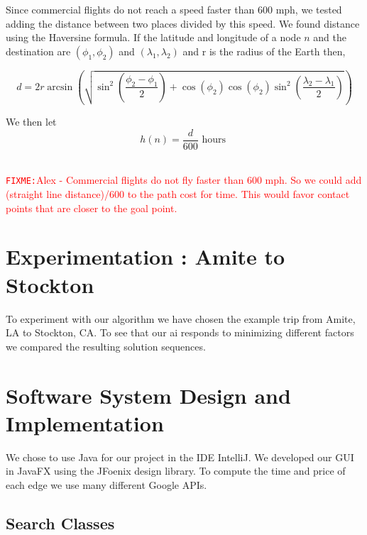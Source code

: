 \documentclass[11pt]{article}
\newcommand{\FIXME}[1]{ \ \\ \hspace* {-1.5 cm}
  \textcolor{red}{\texttt{FIXME:}#1} \medskip\par}
\begin{document}
Since commercial flights do not reach a speed faster than 600 mph, we tested adding the distance between two places divided by this speed. 
We found distance using the Haversine formula. If the latitude and longitude of a node $n$ and the destination are $(\phi_1,\phi_2)$ and $(\lambda_1,\lambda_2)$ and r is the radius of the Earth then,

$$d = 2r \arcsin \left( \sqrt{\sin^2 \left(\frac{\phi_2-\phi_1}{2} \right)+\cos(\phi_2) \cos(\phi_2) \sin^2 \left( \frac{\lambda_2 - \lambda_1}{2} \right)} \right)$$

We then let
$$h(n) = \frac{d}{600} \text{ hours }$$

\FIXME{Alex - Commercial flights do not fly faster than 600 mph. So we could add (straight line distance)/600 to the path cost for time. This would favor contact points that are closer to the goal point.}


\section{Experimentation : Amite to Stockton}

To experiment with our algorithm we have chosen the example trip from Amite, LA to Stockton, CA. To see that our ai responds to minimizing different factors we compared the resulting solution sequences. 




\pagebreak

\section{Software System Design and Implementation}

We chose to use Java for our project in the IDE IntelliJ. We developed our GUI in JavaFX using the JFoenix design library.
To compute the time and price of each edge we use many different Google APIs. 

\subsection{Search Classes}
\end{document}
